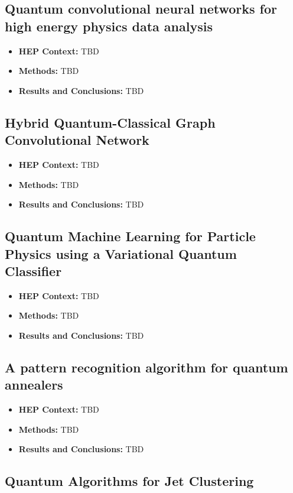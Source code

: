 \subsection{Quantum convolutional neural networks for high energy physics data analysis~\cite{Chen:2020zkj}}
\begin{itemize}
	\item \textbf{HEP Context: }TBD
	\item \textbf{Methods: }TBD
	\item \textbf{Results and Conclusions: }TBD
\end{itemize}\subsection{Hybrid Quantum-Classical Graph Convolutional Network~\cite{Chen:2021ouz}}
\begin{itemize}
	\item \textbf{HEP Context: }TBD
	\item \textbf{Methods: }TBD
	\item \textbf{Results and Conclusions: }TBD
\end{itemize}\subsection{Quantum Machine Learning for Particle Physics using a Variational Quantum Classifier~\cite{Blance:2020nhl}}
\begin{itemize}
	\item \textbf{HEP Context: }TBD
	\item \textbf{Methods: }TBD
	\item \textbf{Results and Conclusions: }TBD
\end{itemize}\subsection{A pattern recognition algorithm for quantum annealers~\cite{Bapst:2019llh}}
\begin{itemize}
	\item \textbf{HEP Context: }TBD
	\item \textbf{Methods: }TBD
	\item \textbf{Results and Conclusions: }TBD
\end{itemize}\subsection{Quantum Algorithms for Jet Clustering~\cite{Wei:2019rqy}}
